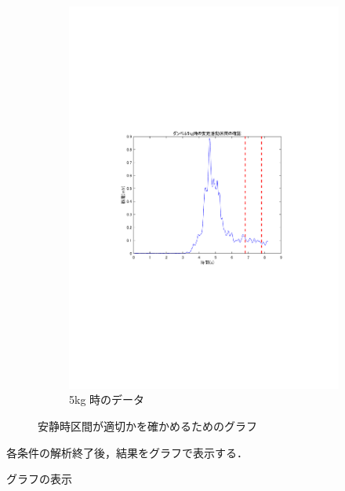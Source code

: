 \documentclass[dvipdfmx, titlepage, t]{jsarticle}
\begin{document}
\begin{figure}[H]
\begin{subfigure}[b]{0.32\linewidth}
        \includegraphics[trim=90 250 100 250 clip,width=\linewidth]{figure/check_5kg.pdf}
        \caption{5kg 時のデータ}
        \label{fig:chc}
    \end{subfigure}

    \caption{安静時区間が適切かを確かめるためのグラフ} %
    \label{fig:check_four_data} %
\end{figure}

    各条件の解析終了後，結果をグラフで表示する．

    \begin{program}[H]
        \caption{グラフの表示}
        \inputminted[linenos,
        firstline=153,
        lastline=163,
        frame=lines,
        fontsize = \small]{matlab}{code/Exp3_10_Matlab.m}
        \label{lst:3_10_graph}        
    \end{program}
\end{document}
